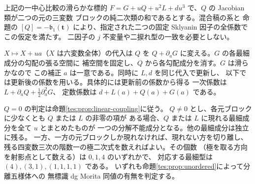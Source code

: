 \begin{proposition}[純ブロック二次結合の判定]\label{tes:prop:quadratic-coupling}
上記の一中心比較の滑らかな標的
$F=G+uQ+u^2L+du^3$ で、$Q$ の Jacobian 類が二つの元の三変数
ブロックの純二次類の和であるとする。混合稿の系と
命題の $[Q]=-\mathfrak b_1(\mathbf t)$
により、指定された二つの固定 Sklyanin 因子の全係数でこの仮定を満たす。
二因子の $j$ 不変量や二捩れ型の一致を必要としない。

$X\mapsto X+ua$（$X$ は六変数全体）の代入は $Q$ を
$Q+\partial_aG$ に変える。$G$ の各最細成分の勾配の張る空間に
補空間を固定し、$Q$ から各勾配成分を消す。$G$ は滑らかなので
この補正 $a$ は一意である。同時に $L,d$ を同じ代入で更新し、
以下では更新後の係数を用いる。具体的には更新前の係数から得る
一次係数は $L+\partial_aQ+\tfrac12\partial_a^2G$、
定数係数は $d+L(a)+Q(a)+G(a)$ である。

$Q=0$ の判定は命題\ref{tes:prop:linear-coupling}に従う。
$Q\ne0$ とし、各元ブロックに少なくとも $Q$ または $L$ の非零の項が
ある場合、$Q$ または $L$ に現れる最細成分を全て $u$ とまとめたものが
一つの分解不能成分となる。他の最細成分は独立に残る。
一方、一方の元ブロックしか現れなければ、現れない方を切り離し、
残る四変数三次の階数一の極二次式を数えればよい。その個数
（極を取る方向を射影点として数える）は $0,1,4$ のいずれかで、
対応する最細型は $(4),(3,1),(1,1,1,1)$ である。
いずれも命題\ref{tes:prop:unordered}によって分離五様体への
無標識 dg Morita 同値の有無を判定する。
\end{proposition}

